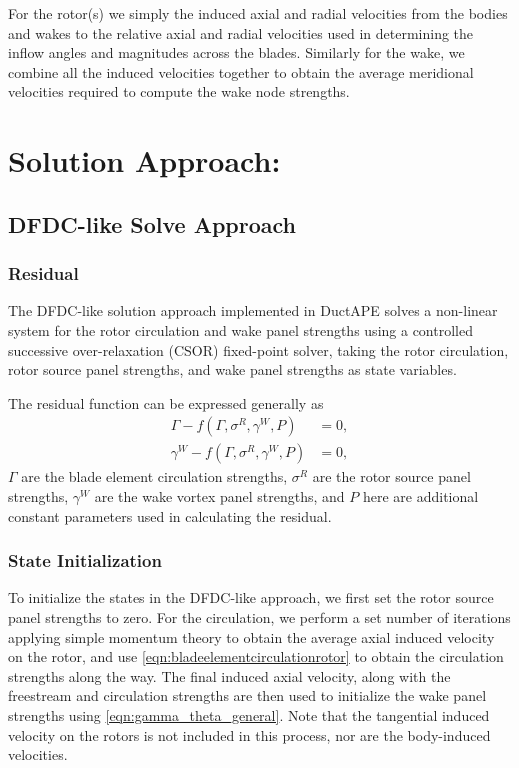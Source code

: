 For the rotor(s) we simply the induced axial and radial velocities from the bodies and wakes to the relative axial and radial velocities used in determining the inflow angles and magnitudes across the blades.
%
Similarly for the wake, we combine all the induced velocities together to obtain the average meridional velocities required to compute the wake node strengths.

\section{Solution Approach:}
\subsection{DFDC-like Solve Approach}

\subsubsection{Residual}
\label{sssec:dfdcresid}

The DFDC-like solution approach implemented in DuctAPE solves a non-linear system for the rotor circulation and wake panel strengths using a controlled successive over-relaxation (CSOR) fixed-point solver, taking the rotor circulation, rotor source panel strengths, and wake panel strengths as state variables.

%
The residual function can be expressed generally as
\begin{subequations}
    \label{eqn:dfdcresid}
    \begin{align}
        \Gamma - f\left(\Gamma, \sigma^R, \gamma^W, P\right) &= 0, \\
        \gamma^W - f\left(\Gamma, \sigma^R, \gamma^W, P\right) &= 0,
    \end{align}
\end{subequations}
 \where \(\Gamma\) are the blade element circulation strengths, \(\sigma^R\) are the rotor source panel strengths, \(\gamma^W\) are the wake vortex panel strengths, and \(P\) here are additional constant parameters used in calculating the residual.


\subsubsection{State Initialization}
\label{sssec:dfdcinit}

To initialize the states in the DFDC-like approach, we first set the rotor source panel strengths to zero.
%
For the circulation, we perform a set number of iterations applying simple momentum theory to obtain the average axial induced velocity on the rotor, and use \cref{eqn:bladeelementcirculationrotor} to obtain the circulation strengths along the way.
%
The final induced axial velocity, along with the freestream and circulation strengths are then used to initialize the wake panel strengths using \cref{eqn:gamma_theta_general}.
%
Note that the tangential induced velocity on the rotors is not included in this process, nor are the body-induced velocities.


